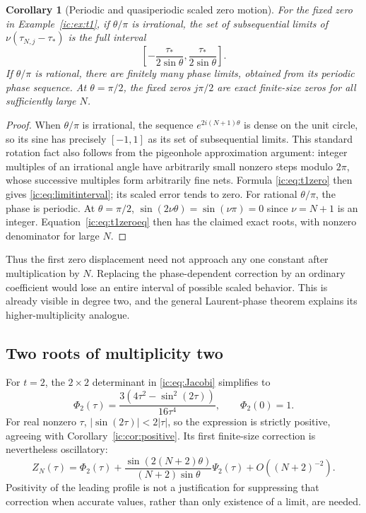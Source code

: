 \documentclass[11pt,a4paper]{article}
\numberwithin{equation}{section}
\newtheorem{corollary}[theorem]{Corollary}
\theoremstyle{definition}
\theoremstyle{remark}
\begin{document}
\begin{corollary}[Periodic and quasiperiodic scaled zero motion]
\label{ic:cor:quasi}
For the fixed zero in Example~\ref{ic:ex:t1}, if $\theta/\pi$ is
irrational, the set of subsequential limits of
$\nu(\tau_{N,j}-\tau_*)$ is the full interval
\begin{equation}\label{ic:eq:limitinterval}
 \left[-\frac{\tau_*}{2\sin\theta},
        \frac{\tau_*}{2\sin\theta}\right].
\end{equation}
If $\theta/\pi$ is rational, there are finitely many phase limits,
obtained from its periodic phase sequence. At $\theta=\pi/2$, the
fixed zeros $j\pi/2$ are exact finite-size zeros for all sufficiently
large $N$.
\end{corollary}
\begin{proof}
When $\theta/\pi$ is irrational, the sequence $e^{2i(N+1)\theta}$ is
dense on the unit circle, so its sine has precisely $[-1,1]$ as its set
of subsequential limits. This standard rotation fact also follows from
the pigeonhole approximation argument: integer multiples of an
irrational angle have arbitrarily small nonzero steps modulo $2\pi$,
whose successive multiples form arbitrarily fine nets. Formula
\eqref{ic:eq:t1zero} then gives \eqref{ic:eq:limitinterval}; its scaled error
tends to zero. For rational $\theta/\pi$, the phase is periodic.
At $\theta=\pi/2$, $\sin(2\nu\theta)=\sin(\nu\pi)=0$ since
$\nu=N+1$ is an integer. Equation~\eqref{ic:eq:t1zeroeq} then has the
claimed exact roots, with nonzero denominator for large $N$.
\end{proof}

Thus the first zero displacement need not approach any one constant
after multiplication by $N$. Replacing the phase-dependent correction
by an ordinary coefficient would lose an entire interval of possible
scaled behavior. This is already visible in degree two, and the general
Laurent-phase theorem explains its higher-multiplicity analogue.

\subsection{Two roots of multiplicity two}
For $t=2$, the $2\times2$ determinant in \eqref{ic:eq:Jacobi} simplifies to
\begin{equation}\label{ic:eq:Phi2}
 \Phi_2(\tau)=\frac{3(4\tau^2-\sin^2(2\tau))}{16\tau^4},
 \qquad \Phi_2(0)=1.
\end{equation}
For real nonzero $\tau$, $|\sin(2\tau)|<2|\tau|$, so the expression is
strictly positive, agreeing with Corollary~\ref{ic:cor:positive}. Its
first finite-size correction is nevertheless oscillatory:
\[
 Z_N(\tau)=\Phi_2(\tau)+
 \frac{\sin(2(N+2)\theta)}{(N+2)\sin\theta}\Psi_2(\tau)
 +O((N+2)^{-2}).
\]
Positivity of the leading profile is not a justification for suppressing
that correction when accurate values, rather than only existence of a
limit, are needed.
\end{document}
